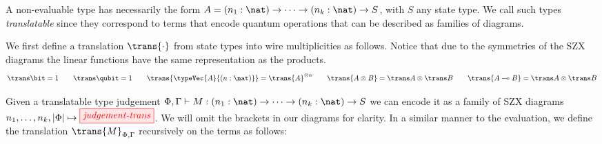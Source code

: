 A non-evaluable type has necessarily the form $A = (n_1:\nat) \to \dots \to (n_k:\nat) \to S$,
with $S$ any state type.
We call such types \textit{translatable} since they correspond to terms that
encode quantum operations that can be described as families of diagrams.

We first define a translation $\trans{\cdot}$ from state types
into wire multiplicities as follows.
Notice that due to the symmetries of the SZX diagrams
the linear functions have the same representation as the products.
\[
    \trans\bit = 1
    \qquad
    \trans\qubit = 1
    \qquad
    \trans{\typeVec{A}{(n: \nat)}} = \trans{A}^{\otimes n}
    \qquad
    \trans{A \otimes B} = \trans A \otimes \trans B
    \qquad
    \trans{A \multimap B} = \trans A \otimes \trans B
\]

Given a translatable type judgement
$\Phi, \Gamma \vdash M : (n_1:\nat) \to \dots \to (n_k:\nat) \to S$
we can encode it as a family of SZX diagrams
\(
  n_1, \dots, n_k, |\Phi| \mapsto \tikzfig{judgement-trans}
\).
We will omit the brackets in our diagrams for clarity.
In a similar manner to the evaluation, we define
the translation $\trans{M}_{\Phi,\Gamma}$
recursively on the terms as follows: 

